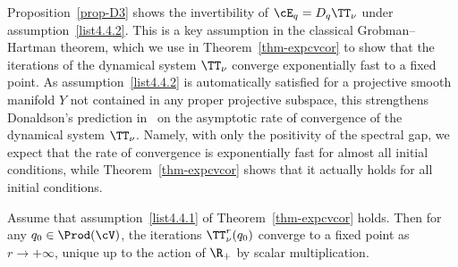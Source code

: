 Proposition~\ref{prop-D3} shows the invertibility of $\cE_q=D_q\TT_\nu$ under assumption~\eqref{list4.4.2}. This is a key assumption in the classical Grobman--Hartman theorem, which we use in Theorem~\ref{thm-expcvcor} to show that the iterations of the dynamical system $\TT_\nu$ converge exponentially fast to a fixed point. As assumption~\eqref{list4.4.2} is automatically satisfied for a projective smooth manifold $Y$ not contained in any proper projective subspace, this strengthens Donaldson's prediction in~\cite[Section~4.1]{D} on the asymptotic rate of convergence of the dynamical system $\TT_\nu$. Namely, with only the positivity of the spectral gap, we expect that the rate of convergence is exponentially fast for almost all initial conditions, while Theorem~\ref{thm-expcvcor} shows that it actually holds for all initial conditions.


%

\begin{prop}\label{Psicv}
Assume that assumption~\eqref{list4.4.1} of Theorem~\ref{thm-expcvcor} holds. Then for any $q_0\in\Prod(\cV)$, the iterations $\TT_\nu^r (q_0)$ converge to a fixed point as $r\to+\infty$, unique up to the action of $\R_+$ by scalar multiplication.
\end{prop}


